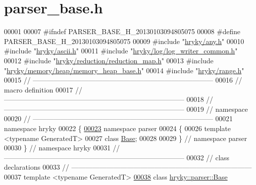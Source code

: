 \hypertarget{parser__base_8h_source}{\section{parser\-\_\-base.\-h}
}

\begin{DoxyCode}
00001 
00007 \textcolor{preprocessor}{#ifndef PARSER\_BASE\_H\_20130103094805075}
00008 \textcolor{preprocessor}{}\textcolor{preprocessor}{#define PARSER\_BASE\_H\_20130103094805075}
00009 \textcolor{preprocessor}{}\textcolor{preprocessor}{#include "\hyperlink{any_8h}{hryky/any.h}"}
00010 \textcolor{preprocessor}{#include "\hyperlink{ascii_8h}{hryky/ascii.h}"}
00011 \textcolor{preprocessor}{#include "\hyperlink{log__writer__common_8h}{hryky/log/log_writer_common.h}"}
00012 \textcolor{preprocessor}{#include "\hyperlink{reduction__map_8h}{hryky/reduction/reduction_map.h}"}
00013 \textcolor{preprocessor}{#include "\hyperlink{memory__heap__base_8h}{hryky/memory/heap/memory_heap_base.h}"}
00014 \textcolor{preprocessor}{#include "\hyperlink{range_8h}{hryky/range.h}"}
00015 \textcolor{comment}{//
      ------------------------------------------------------------------------------}
00016 \textcolor{comment}{// macro definition}
00017 \textcolor{comment}{//
      ------------------------------------------------------------------------------}
00018 \textcolor{comment}{//
      ------------------------------------------------------------------------------}
00019 \textcolor{comment}{// namespace}
00020 \textcolor{comment}{//
      ------------------------------------------------------------------------------}
00021 \textcolor{keyword}{namespace }hryky
00022 \{
\hypertarget{parser__base_8h_source_l00023}{}\hyperlink{namespacehryky_1_1parser}{00023} \textcolor{keyword}{namespace }parser
00024 \{
00026     \textcolor{keyword}{template} <\textcolor{keyword}{typename} GeneratedT>
00027     \textcolor{keyword}{class }\hyperlink{classhryky_1_1parser_1_1_base}{Base};
00028 
00029 \} \textcolor{comment}{// namespace parser}
00030 \} \textcolor{comment}{// namespace hryky}
00031 \textcolor{comment}{//
      ------------------------------------------------------------------------------}
00032 \textcolor{comment}{// class declarations}
00033 \textcolor{comment}{//
      ------------------------------------------------------------------------------}
00037 \textcolor{comment}{}\textcolor{keyword}{template} <\textcolor{keyword}{typename} GeneratedT>
\hypertarget{parser__base_8h_source_l00038}{}\hyperlink{classhryky_1_1parser_1_1_base}{00038} \textcolor{keyword}{class }\hyperlink{classhryky_1_1parser_1_1_base}{hryky::parser::Base}

\end{DoxyCode}
